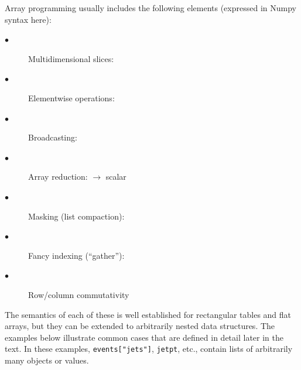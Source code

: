 \documentclass{webofc}
\begin{document}
Array programming usually includes the following elements (expressed in Numpy syntax here):

\begin{description}
\item[\hspace{1 cm}$\bullet$] Multidimensional slices: 
\item[\hspace{1 cm}$\bullet$] Elementwise operations: 
\item[\hspace{1 cm}$\bullet$] Broadcasting: 
\item[\hspace{1 cm}$\bullet$] Array reduction:  $\to$ scalar
\item[\hspace{1 cm}$\bullet$] Masking (list compaction): 
\item[\hspace{1 cm}$\bullet$] Fancy indexing (``gather''): 
\item[\hspace{1 cm}$\bullet$] Row/column commutativity 
\end{description}

\noindent The semantics of each of these is well established for rectangular tables and flat arrays, but they can be extended to arbitrarily nested data structures. The examples below illustrate common cases that are defined in detail later in the text. In these examples, {\small\texttt{events["jets"]}}, {\small\texttt{jetpt}}, etc., contain lists of arbitrarily many objects or values.
\end{document}
